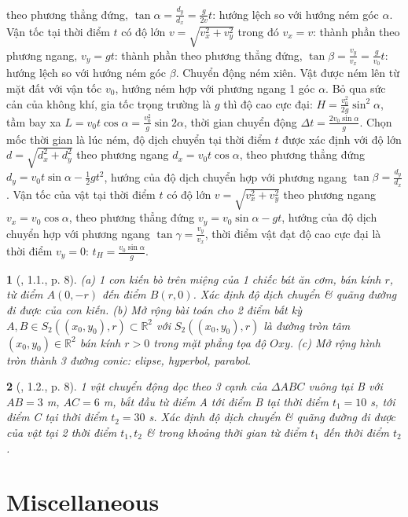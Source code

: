 \documentclass{article}
\newtheorem{baitoan}{}
\begin{document}
theo phương thẳng đứng, $\tan\alpha = \frac{d_y}{d_x} = \frac{g}{2v}t$: hướng lệch so với hướng ném góc $\alpha$. Vận tốc tại thời điểm $t$ có độ lớn $v = \sqrt{v_x^2 + v_y^2}$ trong đó $v_x = v$: thành phần theo phương ngang, $v_y = gt$: thành phần theo phương thẳng đứng, $\tan\beta = \frac{v_y}{v_x} = \frac{g}{v_0}t$: hướng lệch so với hướng ném góc $\beta$.  {\sf Chuyển động ném xiên.} Vật được ném lên từ mặt đất với vận tốc $v_0$, hướng ném hợp với phương ngang 1 góc $\alpha$. Bỏ qua sức cản của không khí, gia tốc trọng trường là $g$ thì độ cao cực đại: $H = \frac{v_0^2}{2g}\sin^2\alpha$, tầm bay xa $L = v_0t\cos\alpha = \frac{v_0^2}{g}\sin2\alpha$, thời gian chuyển động $\Delta t = \frac{2v_0\sin\alpha}{g}$. Chọn mốc thời gian là lúc ném, độ dịch chuyển tại thời điểm $t$ được xác định với độ lớn $d = \sqrt{d_x^2 + d_y^2}$ theo phương ngang $d_x = v_0t\cos\alpha$, theo phương thẳng đứng $d_y = v_0t\sin\alpha - \frac{1}{2}gt^2$, hướng của độ dịch chuyển hợp với phương ngang $\tan\beta = \frac{d_y}{d_x}$. Vận tốc của vật tại thời điểm $t$ có độ lớn $v = \sqrt{v_x^2 + v_y^2}$ theo phương ngang $v_x = v_0\cos\alpha$, theo phương thẳng đứng $v_y = v_0\sin\alpha - gt$, hướng của độ dịch chuyển hợp với phương ngang $\tan\gamma = \frac{v_y}{v_x}$, thời điểm vật đạt độ cao cực đại là thời điểm $v_y = 0$: $t_H = \frac{v_0\sin\alpha}{g}$.

\begin{baitoan}[\cite{Giang_Hang_Trung_ncpt_Vat_Ly_10}, 1.1., p. 8]
	(a) 1 con kiến bò trên miệng của 1 chiếc bát ăn cơm, bán kính $r$, từ điểm $A(0,-r)$ đến điểm $B(r,0)$. Xác định độ dịch chuyển \& quãng đường đi được của con kiến. (b) Mở rộng bài toán cho 2 điểm bất kỳ $A,B\in S_2((x_0,y_0),r)\subset\mathbb{R}^2$ với $S_2((x_0,y_0),r)$ là đường tròn tâm $(x_0,y_0)\in\mathbb{R}^2$ bán kính $r > 0$ trong mặt phẳng tọa độ $Oxy$. (c) Mở rộng hình tròn thành 3 đường conic: elipse, hyperbol, parabol.
\end{baitoan}

\begin{baitoan}[\cite{Giang_Hang_Trung_ncpt_Vat_Ly_10}, 1.2., p. 8]
	1 vật chuyển động dọc theo 3 cạnh của $\Delta ABC$ vuông tại B với $AB = 3$ {\rm m}, $AC = 6$ {\rm m}, bắt đầu từ điểm A tới điểm B tại thời điểm $t_1 = 10$ {\rm s}, tới điểm C tại thời điểm $t_2 = 30$ {\rm s}. Xác định độ dịch chuyển \& quãng đường đi được của vật tại 2 thời điểm $t_1,t_2$ \& trong khoảng thời gian từ điểm $t_1$ đến thời điểm $t_2$.
\end{baitoan}

%	


\section{Miscellaneous}


\printbibliography[heading=bibintoc]
	
\end{document}
